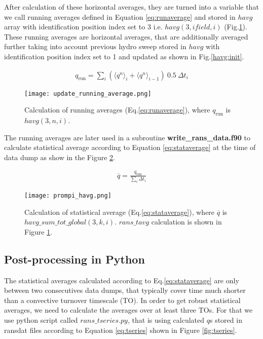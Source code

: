 \documentclass[11pt,paper=a4]{report}
\begin{document}
After calculation of these horizontal averages, they are turned into a variable that we call running averages defined in Equation \ref{eq:runaverage} and stored in $havg$ array with identification position index set to 3 i.e. $havg(3,ifield,i)$ (Fig.\ref{fig:runaverage}). These running averages are horizontal averages, that are additionally averaged further taking into account previous hydro sweep stored in $havg$ with identification position index set to 1 and updated as shown in Fig.\ref{havg:init}. 

\begin{align}
  q_{\mbox{run}} = \sum_i \left(\langle q^n \rangle_i + \langle q^n \rangle_{i-1} \right) \ 0.5 \ \Delta t_i
\label{eq:runaverage}  
\end{align}  

\begin{figure}[!h]
\centerline{
\texttt{[image: update\_running\_average.png]}}
\caption{Calculation of running averages (Eq.\ref{eq:runaverage}), where $q_{\mbox{run}}$ is $havg(3,n,i)$.}
\label{fig:runaverage}
\end{figure}

The running averages are later used in a subroutine {\bf write\_rans\_data.f90} to calculate statistical average according to Equation \ref{eq:stataverage} at the time of data dump as show in the Figure \ref{fig:stataverage}.  

\begin{align}
  \overline{q} =  \frac{q_{\mbox{run}}}{\sum_i \Delta t_i}
\label{eq:stataverage}  
\end{align}  

\begin{figure}[!h]
\centerline{
\texttt{[image: prompi\_havg.png]}}
\caption{Calculation of statistical average (Eq.\ref{eq:stataverage}), where $\overline{q}$ is $havg\_sum\_tot\_global(3,k,i)$. $rans\_tavg$ calculation is shown in Figure \ref{fig:runaverage}.}
\label{fig:stataverage}
\end{figure}


\subsection{Post-processing in Python}

The statistical averages calculated according to Eq.\ref{eq:stataverage} are only between two consecutives data dumps, that typically cover time much shorter than a convective turnover timescale (TO). In order to get robust statistical averages, we need to calculate the averages over at least three TOs. For that we use python script called $rans\_tseries.py$, that is using calculated $q$s stored in ransdat files according to Equation \ref{eq:tseries} shown in Figure \ref{fig:tseries}. 
\end{document}
